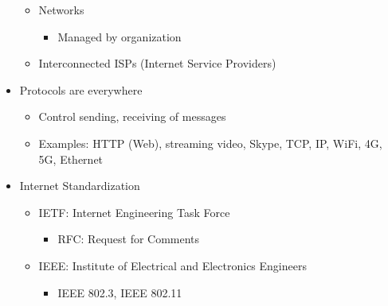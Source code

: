 \begin{itemize}
\begin{itemize}
\begin{itemize}
          \end{itemize}

        \item Networks

          \begin{itemize}

            \item Managed by organization

          \end{itemize}

        \item Interconnected ISPs (Internet Service Providers)

    \end{itemize}

  \item Protocols are everywhere

    \begin{itemize}

      \item Control sending, receiving of messages

      \item Examples: HTTP (Web), streaming video, Skype, TCP, IP, WiFi, 4G, 5G, Ethernet

    \end{itemize}

  \item Internet Standardization

    \begin{itemize}

      \item IETF: Internet Engineering Task Force

        \begin{itemize}

          \item RFC: Request for Comments

        \end{itemize}

      \item IEEE: Institute of Electrical and Electronics Engineers

        \begin{itemize}

          \item IEEE 802.3, IEEE 802.11

        \end{itemize}

    \end{itemize}


\end{itemize}
